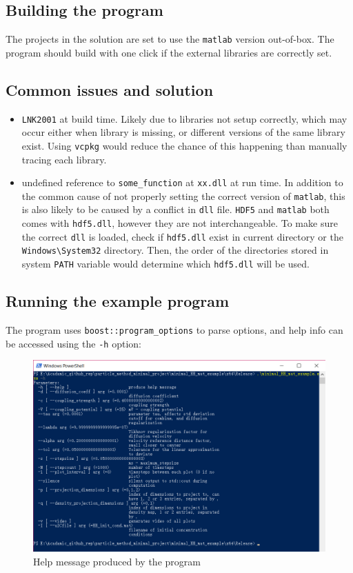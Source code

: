 \documentclass[10pt]{article} %
\begin{document}
\subsection{Building the program}

The projects in the solution are set to use the \texttt{matlab} version out-of-box. The program should build with one click if the external libraries are correctly set.

\subsection{Common issues and solution}
\begin{itemize}
\item
\texttt{LNK2001} at build time. Likely due to libraries not setup correctly, which may occur either when library is missing, or different versions of the same library exist. Using \texttt{vcpkg} would reduce the chance of this happening than manually tracing each library.
\item
undefined reference to \texttt{some\_function} at \texttt{xx.dll} at run time. In addition to the common cause of not properly setting the correct version of \texttt{matlab}, this is also likely to be caused by a conflict in \texttt{dll} file. \texttt{HDF5} and \texttt{matlab} both comes with \texttt{hdf5.dll}, however they are not interchangeable. To make sure the correct \texttt{dll} is loaded, check if \texttt{hdf5.dll} exist in current directory or the \texttt{Windows\textbackslash System32} directory. Then, the order of the directories stored in system \texttt{PATH} variable would determine which \texttt{hdf5.dll} will be used.
\end{itemize}
\subsection{Running the example program}
The program uses \texttt{boost::program\_options} to parse options, and help info can be accessed using the \texttt{-h} option:
\begin{figure}[H]
\includegraphics[width=\textwidth]{help_message}
\caption{Help message produced by the program}
\end{figure}
\end{document}
